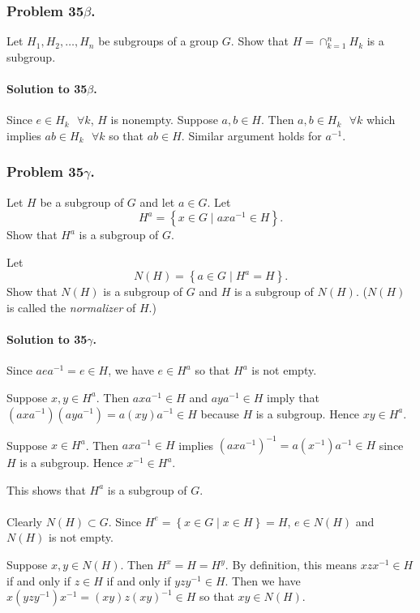 \subsubsection{Problem 35$\beta$.}
Let $H_1, H_2, \dots, H_n$ be subgroups of a group $G$. Show that
$H = \cap_{k=1}^n H_k$ is a subgroup.

\paragraph*{Solution to 35$\beta$.}
Since $e \in H_k \mbox{ } \forall k$, $H$ is nonempty.
Suppose $a, b \in H$. Then $a, b \in H_k \mbox{ } \forall k$ which implies
$ab \in H_k \mbox{ } \forall k$ so that $ab \in H$. Similar argument holds for $a^{-1}$.

\subsubsection{Problem 35$\gamma$.}
Let $H$ be a subgroup of $G$ and let $a \in G$. Let
$$ H^a = \left\{x \in G \mid axa^{-1} \in H \right\}. $$
Show that $H^a$ is a subgroup of $G$.

Let $$N(H) = \left\{ a \in G \mid H^a = H \right\}.$$
Show that $N(H)$ is a subgroup of $G$ and $H$ is a subgroup of $N(H)$.
($N(H)$ is called the \textit{normalizer} of $H$.)

\paragraph*{Solution to 35$\gamma$.}
Since $aea^{-1}=e\in H$, we have $e\in H^a$ so that $H^a$ is not empty.

Suppose $x, y \in H^a$. Then $axa^{-1} \in H$ and $aya^{-1} \in H$ imply that
$(axa^{-1})(aya^{-1}) = a(xy)a^{-1} \in H$ because $H$ is a subgroup. Hence
$xy \in H^a$.

Suppose $x \in H^a$. Then $axa^{-1} \in H$ implies
$(axa^{-1})^{-1} = a(x^{-1})a^{-1} \in H$ since $H$ is a subgroup. Hence
$x^{-1} \in H^a$.

This shows that $H^a$ is a subgroup of $G$.

\paragraph{}
Clearly $N(H) \subset G$. Since $H^e=\left\{x\in G \mid x\in H \right\}=H$,
$e \in N(H)$ and $N(H)$ is not empty.

Suppose $x, y \in N(H)$. Then $H^x = H = H^y$. By definition, this means
$xzx^{-1} \in H$ if and only if $z \in H$ if and only if $yzy^{-1} \in H$.
Then we have $x(yzy^{-1})x^{-1} = (xy)z(xy)^{-1} \in H$ so that $xy \in N(H)$.

